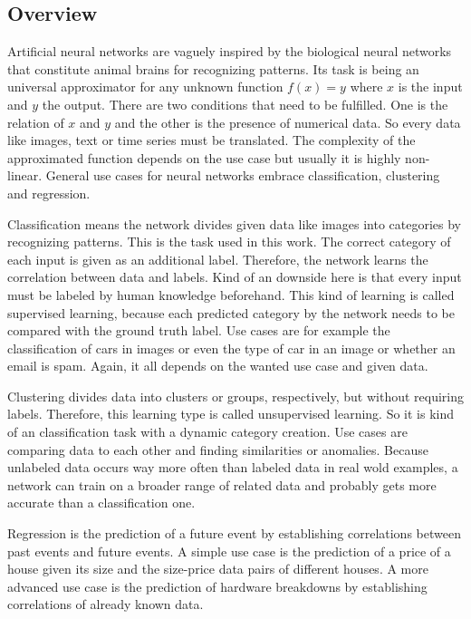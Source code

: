 \subsection{Overview}
\label{sec:neural-networks-overview}
Artificial neural networks are vaguely inspired by the biological neural networks that constitute animal brains for recognizing patterns.
Its task is being an universal approximator for any unknown function $f(x) = y$ where $x$ is the input and $y$ the output.
There are two conditions that need to be fulfilled.
One is the relation of $x$ and $y$ and the other is the presence of numerical data.
So every data like images, text or time series must be translated.
The complexity of the approximated function depends on the use case but usually it is highly non-linear.
General use cases for neural networks embrace classification, clustering and regression.

Classification means the network divides given data like images into categories by recognizing patterns.
This is the task used in this work.
The correct category of each input is given as an additional label.
Therefore, the network learns the correlation between data and labels.
Kind of an downside here is that every input must be labeled by human knowledge beforehand.
This kind of learning is called supervised learning, because each predicted category by the network needs to be compared with the ground truth label.
Use cases are for example the classification of cars in images or even the type of car in an image or whether an email is spam.
Again, it all depends on the wanted use case and given data.

Clustering divides data into clusters or groups, respectively, but without requiring labels.
Therefore, this learning type is called unsupervised learning.
So it is kind of an classification task with a dynamic category creation.
Use cases are comparing data to each other and finding similarities or anomalies.
Because unlabeled data occurs way more often than labeled data in real wold examples, a network can train on a broader range of related data and probably gets more accurate than a classification one.

Regression is the prediction of a future event by establishing correlations between past events and future events.
A simple use case is the prediction of a price of a house given its size and the size-price data pairs of different houses.
A more advanced use case is the prediction of hardware breakdowns by establishing correlations of already known data.